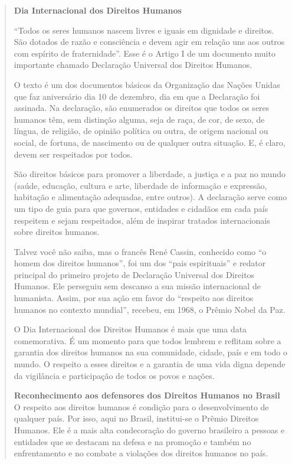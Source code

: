 \begin{quote}
\textbf{Dia Internacional dos Direitos Humanos}


``Todos os seres humanos nascem livres e iguais em dignidade e
direitos. São dotados de razão e consciência e devem agir em relação
uns aos outros com espírito de fraternidade''. Esse é o Artigo I de um
documento muito importante chamado Declaração Universal dos Direitos
Humanos.

O texto é um dos documentos básicos da Organização das Nações Unidas que
faz aniversário dia 10 de dezembro, dia em que a Declaração foi
assinada. Na declaração, são enumerados os direitos que todos os seres
humanos têm, sem distinção alguma, seja de raça, de cor, de sexo, de
língua, de religião, de opinião política ou outra, de origem nacional ou
social, de fortuna, de nascimento ou de qualquer outra situação. E, é
claro, devem ser respeitados por todos.

São direitos básicos para promover a liberdade, a justiça e a paz no
mundo (saúde, educação, cultura e arte, liberdade de informação e
expressão, habitação e alimentação adequadas, entre outros). A
declaração serve como um tipo de guia para que governos, entidades e
cidadãos em cada país respeitem e sejam respeitados, além de inspirar
tratados internacionais sobre direitos humanos.

Talvez você não saiba, mas o francês René Cassin, conhecido como ``o
homem dos direitos humanos'', foi um dos ``pais espirituais'' e redator
principal do primeiro projeto de Declaração Universal dos Direitos
Humanos. Ele perseguiu sem descanso a sua missão internacional de
humanista. Assim, por sua ação em favor do ``respeito aos direitos
humanos no contexto mundial'', recebeu, em 1968, o Prêmio Nobel da Paz.

O Dia Internacional dos Direitos Humanos é mais que uma data
comemorativa. É um momento para que todos lembrem e reflitam sobre a
garantia dos direitos humanos na sua comunidade, cidade, país e em todo
o mundo. O respeito a esses direitos e a garantia de uma vida digna
depende da vigilância e participação de todos os povos e nações.

\textbf{Reconhecimento aos defensores dos Direitos Humanos no Brasil}\\
O respeito aos direitos humanos é condição para o desenvolvimento de
qualquer país. Por isso, aqui no Brasil, institui-se o Prêmio Direitos
Humanos. Ele é a mais alta condecoração do governo brasileiro a pessoas
e entidades que se destacam na defesa e na promoção e também no
enfrentamento e no combate a violações dos direitos humanos no país.

\end{quote}

